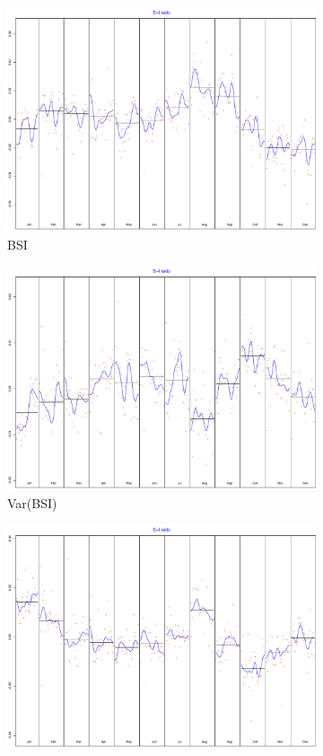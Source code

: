 \documentclass[12pt,a4paper,oneside]{book}
\begin{document}
\begin{figure}[H]
\begin{subfigure}{.5\textwidth}
  \centering
  \includegraphics[width=.8\linewidth]{Graphs/S-I_1.pdf}
  \caption{BSI}
\end{subfigure}%
\begin{subfigure}{.5\textwidth}
  \centering
  \includegraphics[width=.8\linewidth]{Graphs/S-I_2.pdf}
  \caption{Var(BSI)}
\end{subfigure}
\begin{subfigure}{.5\textwidth}
  \centering
  \includegraphics[width=.8\linewidth]{Graphs/S-I_3.pdf}

\end{subfigure}
\end{figure}
\end{document}
